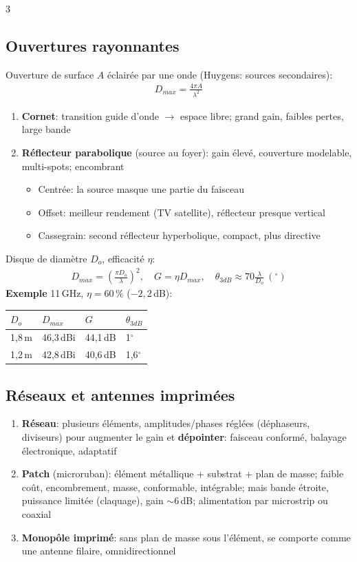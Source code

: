 \documentclass[12pt, a4paper]{article}
\begin{document}
\begin{multicols*}{3}
	\colbreak
	\subsection{Ouvertures rayonnantes}
	Ouverture de surface $A$ éclairée par une onde (Huygens: sources secondaires):
	\begin{gather*}
		D_{max}=\frac{4\pi A}{\lambda^2}
	\end{gather*}
	\begin{enumerate}[\roman*.]
		\item \textbf{Cornet}: transition guide d'onde $\to$ espace libre; grand gain, faibles pertes, large bande
		\item \textbf{Réflecteur parabolique} (source au foyer): gain élevé, couverture modelable, multi-spots; encombrant
		      \begin{itemize}
			      \item Centrée: la source masque une partie du faisceau
			      \item Offset: meilleur rendement (TV satellite), réflecteur presque vertical
			      \item Cassegrain: second réflecteur hyperbolique, compact, plus directive
		      \end{itemize}
	\end{enumerate}
	Disque de diamètre $D_o$, efficacité $\eta$:
	\begin{gather*}
		D_{max}=\left(\frac{\pi D_o}{\lambda}\right)^2,\quad G=\eta D_{max},\quad\theta_{3dB}\approx70\frac{\lambda}{D_o}\ (^\circ)
	\end{gather*}
	\textbf{Exemple} 11\,GHz, $\eta=60\,\%$ ($-2{,}2$\,dB):

	\begin{tabular}{|l|l|l|l|}
		\hline
		$D_o$  & $D_{max}$  & $G$     & $\theta_{3dB}$ \\
		\hline
		1,8\,m & 46,3\,dBi & 44,1\,dB & 1$^\circ$      \\
		1,2\,m & 42,8\,dBi & 40,6\,dB & 1,6$^\circ$    \\
		\hline
	\end{tabular}

	\subsection{Réseaux et antennes imprimées}
	\begin{enumerate}[\roman*.]
		\item \textbf{Réseau}: plusieurs éléments, amplitudes/phases réglées (déphaseurs, diviseurs) pour augmenter le gain et \textbf{dépointer}: faisceau conformé, balayage électronique, adaptatif
		\item \textbf{Patch} (microruban): élément métallique + substrat + plan de masse; faible coût, encombrement, masse, conformable, intégrable; mais bande étroite, puissance limitée (claquage), gain $\sim6$\,dB; alimentation par microstrip ou coaxial
		\item \textbf{Monopôle imprimé}: sans plan de masse sous l'élément, se comporte comme une antenne filaire, omnidirectionnel
	\end{enumerate}


\end{multicols*}
\end{document}
